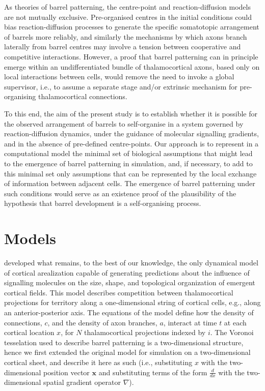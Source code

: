 \documentclass[a4paper,11pt]{article}
\newcommand{\mb}[1]{\mathbf{#1}}
\begin{document}
As theories of barrel patterning, the centre-point and reaction-diffusion
models are not mutually exclusive. Pre-organised centres in the initial
conditions could bias reaction-diffusion processes to generate the specific
somatotopic arrangement of barrels more reliably, and similarly the mechanisms
by which axons branch laterally from barrel centres may involve a tension
between cooperative and competitive interactions. However, a proof that barrel
patterning can in principle emerge within an undifferentiated bundle of
thalamocortical axons, based only on local interactions between cells, would
remove the need to invoke a global supervisor, i.e., to assume a separate
stage and/or extrinsic mechanism for pre-organising thalamocortical
connections.

To this end, the aim of the present study is to establish whether it is
possible for the observed arrangement of barrels to self-organise in a system
governed by reaction-diffusion dynamics, under the guidance of molecular
signalling gradients, and in the absence of pre-defined centre-points. Our
approach is to represent in a computational model the minimal set of
biological assumptions that might lead to the emergence of barrel patterning
in simulation, and, if necessary, to add to this minimal set only assumptions
that can be represented by the local exchange of information between adjacent
cells. The emergence of barrel patterning under such conditions would serve as
an existence proof of the plausibility of the hypothesis that barrel
development is a self-organising process.

\section*{Models}

\cite{karbowski_model_2004} developed what remains, to the best of our knowledge, the
only dynamical model of cortical arealization capable of generating
predictions about the influence of signalling molecules on the size, shape,
and topological organization of emergent cortical fields. This model describes
competition between thalamocortical projections for territory along a
one-dimensional string of cortical cells, e.g., along an anterior-posterior
axis. The equations of the model define how the density of connections, $c$,
and the density of axon branches, $a$, interact at time $t$ at each cortical
location $x$, for $N$ thalamocortical projections indexed by $i$. The Voronoi
tesselation used to describe barrel patterning is a two-dimensional structure,
hence we first extended the original model for simulation on a two-dimensional
cortical sheet, and describe it here as such (i.e., substituting $x$ with the
two-dimensional position vector $\mb{x}$ and substituting terms of the form
$\frac{d}{dx}$ with the two-dimensional spatial gradient operator $\nabla$).
\end{document}

